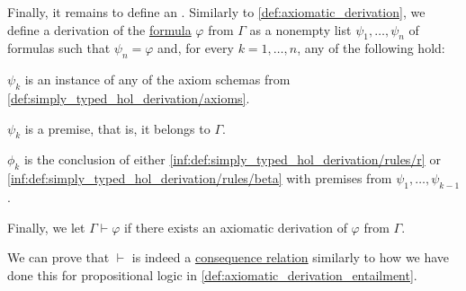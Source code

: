 \begin{definition}
\begin{thmenum}[series=def:simply_typed_hol_derivation]
     Finally, it remains to define an . Similarly to \cref{def:axiomatic_derivation}, we define a derivation of the \hyperref[def:simply_typed_hol_formula]{formula} \( \varphi \) from \( \Gamma \) as a nonempty list \( \psi_1, \ldots, \psi_n \) of formulas such that \( \psi_n = \varphi \) and, for every \( k = 1, \ldots, n \), any of the following hold:
    \begin{thmenum}
       \( \psi_k \) is an instance of any of the axiom schemas from \cref{def:simply_typed_hol_derivation/axioms}.

       \( \psi_k \) is a premise, that is, it belongs to \( \Gamma \).

       \( \phi_k \) is the conclusion of either \ref{inf:def:simply_typed_hol_derivation/rules/r} or \ref{inf:def:simply_typed_hol_derivation/rules/beta} with premises from \( \psi_1, \ldots, \psi_{k-1} \).
    \end{thmenum}

     Finally, we let \( \Gamma \vdash \varphi \) if there exists an axiomatic derivation of \( \varphi \) from \( \Gamma \).
  \end{thmenum}
\end{definition}
\begin{defproof}
  We can prove that \( {\vdash} \) is indeed a \hyperref[def:consequence_relation]{consequence relation} similarly to how we have done this for propositional logic in \cref{def:axiomatic_derivation_entailment}.
\end{defproof}
